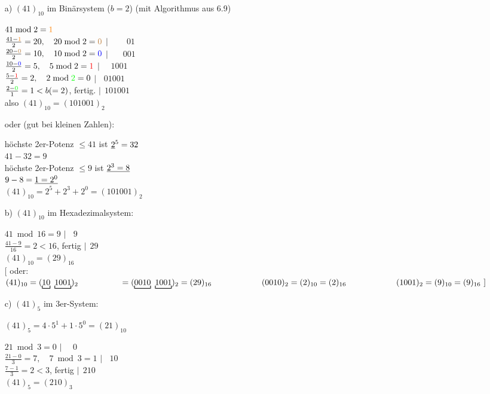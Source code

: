 \documentclass[a4paper, 12pt, twoside] {article}
\begin{document}
\begin{itemize}
\item[a)] $(41)_{10}$ im Binärsystem ($b=2$) (mit Algorithmus aus 6.9)

$41 \bmod 2 = \textcolor{orange}{1}$ \\
$\frac{41-\textcolor{orange}{1}}{2} = 20, \quad 20 \bmod 2 = \textcolor{brown}{0}$ \hfill $|\,\;\,\;\,\;\,\;\,\;01$ \\
$\frac{20-\textcolor{brown}{0}}{2}=10, \quad 10 \bmod 2 = \textcolor{blue}{0}$ \hfill $|\,\;\,\;\,\;\,\;001$ \\
$\frac{10-\textcolor{blue}{0}}{2}=5, \quad 5 \bmod 2 = \textcolor{red}{1}$ \hfill $|\,\;\,\;\,\;1001$ \\
$\frac{5-\textcolor{red}{1}}{2}=2, \quad 2 \bmod \textcolor{green}{2} = 0$ \hfill $|\,\;\,\;01001$ \\
$\frac{2-\textcolor{green}{0}}{1}=1 < b (=2)$, fertig. \hfill $|\,\;101001$ \\
also $(41)_{10} = (101001)_2$

oder (gut bei kleinen Zahlen):

höchste 2er-Potenz $\leq 41$ ist $\uline{2}^5=32$ \\
$41-32 = 9$ \\
höchste 2er-Potenz $\leq 9$ ist $\uline{2^3=8}$ \\
$9-8 = \uline{1 = 2^0}$ \\
$(41)_{10} = 2^5+2^3+2^0 = (101001)_2$

\item[b)] $(41)_{10}$ im Hexadezimalsystem:

$41 \bmod 16 = 9$ \hfill $|\,\;\,\;9$ \\
$\frac{41-9}{16} = 2 < 16$, fertig \hfill $|\,\;29$ \\

$(41)_{10} = (29)_{16}$ \\
$[$ oder: $(41)_{10} = (\underbracket[0.75pt]{10}\ \underbracket[0.75pt]{1001})_2 \\
\text{\qquad \qquad \quad} = (\underbracket[0.75pt]{0010}\ \underbracket[0.75pt]{1001})_2 = (29)_{16}\ \\ \\
\text{\qquad \qquad \qquad} (0010)_2 = (2)_{10} = (2)_{16} \\
\text{\qquad \qquad \qquad} (1001)_2 = (9)_{10} = (9)_{16} \ ]$

\item[c)] $(41)_5$ im 3er-System: 

$(41)_5 = 4 \cdot 5^1 + 1 \cdot 5^0 = (21)_{10}$

$21 \bmod 3 = 0$ \hfill $|\,\;\,\;\,\;0$ \\
$\frac{21-0}{3}=7, \quad 7 \bmod 3 = 1$ \hfill $|\,\;\,\;10$ \\
$\frac{7-1}{3}=2 < 3$, fertig \hfill $|\,\;210$ \\
$(41)_5 = (210)_3$

\end{itemize}
\end{document}

